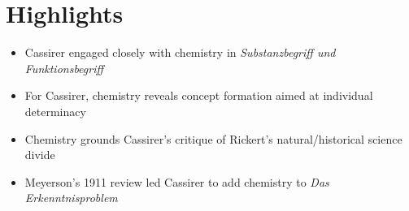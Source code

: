 \documentclass[12pt]{article}
\begin{document}
\section*{Highlights}

\begin{itemize}
\item Cassirer engaged closely with chemistry in \emph{Substanzbegriff und Funktionsbegriff}
\item For Cassirer, chemistry reveals concept formation aimed at individual determinacy
\item Chemistry grounds Cassirer's critique of Rickert's natural/historical science divide
\item Meyerson's 1911 review led Cassirer to add chemistry to \emph{Das Erkenntnisproblem}
\end{itemize}
\end{document}
